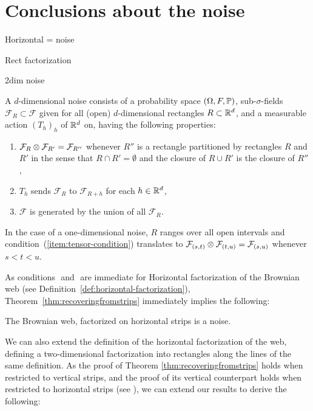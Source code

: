 {
\section{Conclusions about the noise}

Horizontal = noise

Rect factorization

2dim noise

\newcommand{\F}{\mathcal{F}}
A $d$-dimensional noise consists of a probability space $(\Omega,F, \P)$, sub-$\sigma$-fields $\F_R \subset \F$ given for
all (open) $d$-dimensional rectangles $R \subset \R^d$, and a measurable action $(T_h)_h$ of $\R^d$ on, having the following
properties:
\begin{enumerate}
\item \label{item:tensor-condition} $\F_R \tensor \F_{R'} = \F_{R''}$ whenever $R''$ is a
rectangle partitioned by rectangles $R$ and $R'$ in the sense that
$R\cap R'=\emptyset$ and the closure of $R \cup R'$
is the closure of $R''$,
\item \label{item:translation-condition} $T_h$ sends $\F_R$ to $\F_{R+h}$ for each $h \in \R^d$,
\item \label{item:generation-condition} $\F$ is generated by the union of all $\F_R$.
\end{enumerate}

In the case of a one-dimensional noise, $R$ ranges over all open intervals
and condition~(\ref{item:tensor-condition}) translates to
$\F_{(s,t)} \tensor \F_{(t,u)} = \F_{(s,u)}$ whenever $s < t < u$.

As conditions $\label{item:translation-condition}$ and
$\label{item:generation-condition}$ are immediate for
Horizontal factorization of the Brownian web (see
Definition~\ref{def:horizontal-factorization}),
Theorem~\ref{thm:recoveringfromstrips} immediately
implies the following:

\begin{theorem}
The Brownian web, factorized on horizontal strips is a noise.
\end{theorem}

We can also extend the definition of the horizontal
factorization of the web, defining a two-dimensional
factorization into rectangles along the lines of the
same definition. As the proof of Theorem \ref{thm:recoveringfromstrips}
holds when restricted to vertical strips, and the proof of its vertical
counterpart holds when restricted to horizontal strips (see ), we can extend our results to derive the following:

}
